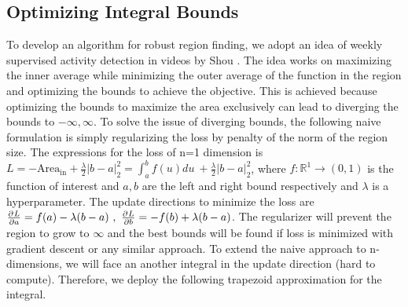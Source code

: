 \subsection{Optimizing Integral Bounds}
To develop an algorithm for robust region finding, we adopt an idea of weekly supervised activity detection in videos by Shou \etal \cite{ioc}. The idea works on maximizing the inner average while minimizing the outer average of the function in the region and optimizing the bounds to achieve the objective. This is achieved because optimizing the bounds to maximize the area exclusively can lead to diverging the bounds to $-\infty,\infty$. To solve the issue of diverging bounds, the following naive formulation is simply regularizing the loss by penalty of the norm of the region size. The expressions for the loss of n=1 dimension is $L = -\text{Area}_{\text{in}} + \frac{\lambda}{2} \left| b-a\right|_{2}^{2} = \int_{a}^{b} f(u)du ~+ \frac{\lambda}{2} \left| b-a\right|_{2}^{2}$, where $f: \mathbb{R}^{1} \rightarrow (0,1)$ is the function of interest and $a,b$ are the left and right bound respectively and $\lambda$ is a hyperparameter. The update directions to minimize the loss are $\frac{\partial^{} L}{\partial a} = f(a) - \lambda (b-a)~,~\frac{\partial^{} L}{\partial b} = - f(b) + \lambda (b-a)$. The regularizer will prevent the region to grow to $\infty$ and the best bounds will be found if loss is minimized with gradient descent or any similar approach.
To extend the naive approach to n-dimensions, we will face an another integral in the update direction (hard to compute). Therefore, we deploy the following trapezoid approximation for the integral.

